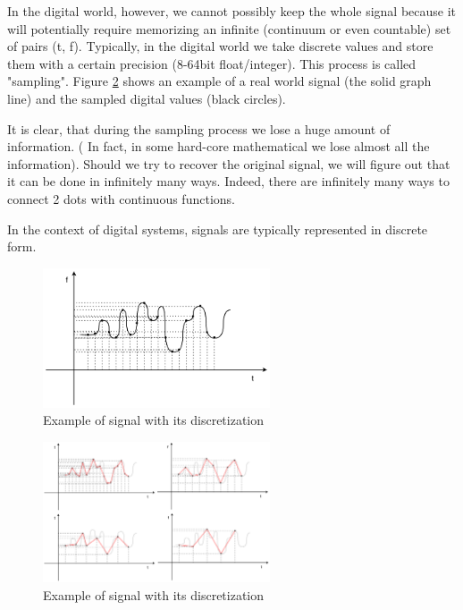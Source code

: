 \documentclass[11pt]{book}
\begin{document}
In the digital world, however, we cannot possibly keep the whole signal because it will potentially require memorizing an infinite  (continuum or even countable) set of pairs (t, f). Typically, in the digital world we take discrete values and store them with a certain precision (8-64bit float/integer). This process is called "sampling". Figure \ref{fig:signal} shows an example of a real world signal (the solid graph line) and the sampled digital values (black circles). 

It is clear, that during the sampling process we lose a huge amount of information. ( In fact, in some hard-core mathematical we lose almost all the information).  Should we try to recover the original signal, we will figure out that it can be done in infinitely many ways. Indeed, there are infinitely many ways to connect 2 dots with continuous functions. 

In the context of digital systems, signals are typically represented in discrete form. 
\begin{figure}[h]
\centering
\includegraphics[width=0.6\textwidth]{images/digitalization.drawio.png}
\caption{Example of signal with its discretization}
\label{fig:signal}
\end{figure}

\begin{figure}[h]
\centering
\includegraphics[width=0.6\textwidth]{images/restore-combined.png}
\caption{Example of signal with its discretization}
\label{fig:signal}
\end{figure}
\end{document}
